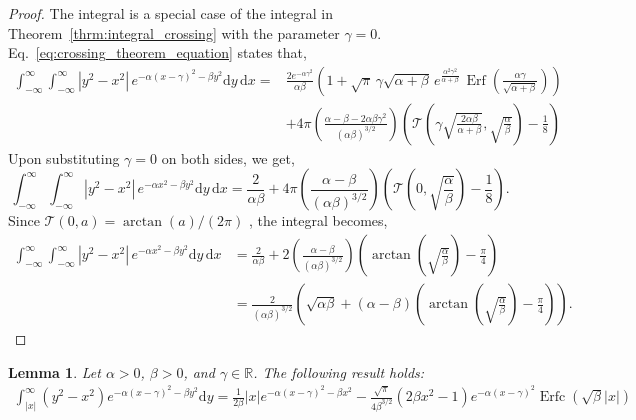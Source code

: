 \documentclass[journal]{IEEEtran}
\theoremstyle{plain}
\newtheorem{lemma}[theorem]{Lemma}
\theoremstyle{definition}
\theoremstyle{remark}
\newcommand{\R}{\mathbb{R}}
\newcommand{\Ot}{\mathcal{T}}
\newcommand{\Erf}{\operatorname{Erf}}
\newcommand{\Erfc}{\operatorname{Erfc}}
\newcommand{\dd}{\mathrm{d}}
\begin{document}
\begin{proof}
The integral is a special case of the integral in Theorem~\ref{thrm:integral_crossing} with the parameter $\gamma=0$. Eq.~\eqref{eq:crossing_theorem_equation} states that,
\begin{equation}
\begin{split}
 \int_{-\infty}^\infty \int_{-\infty}^\infty \left|y^2-x^2\right| \, e^{-\alpha(x-\gamma)^2-\beta y^2} \dd y \, \dd x =& \frac{2e^{-\alpha \gamma^2}}{\alpha\beta} \left(1 + \sqrt{\pi} \, \gamma \sqrt{\alpha + \beta}  \, e^{\frac{\alpha^2 \gamma^2}{\alpha + \beta}}  \, \Erf\left(\frac{\alpha \gamma}{\sqrt{\alpha + \beta}}\right)\right) \\& + 4 \pi \left(\frac{\alpha - \beta - 2\alpha \beta \gamma^2}{\left(\alpha\beta\right)^{3/2}}\right) \left(\Ot\left(\gamma\sqrt{\frac{2\alpha\beta}{\alpha+\beta}}, \sqrt{\frac{\alpha}{\beta}}\right)-\frac{1}{8}\right)
\end{split} 
\end{equation}
Upon substituting $\gamma=0$ on both sides, we get,
\begin{equation}
  \int_{-\infty}^\infty \int_{-\infty}^\infty \left|y^2-x^2\right| \, e^{-\alpha x^2-\beta y^2} \dd y \, \dd x = \frac{2}{\alpha\beta} 
    + 4 \pi \left(\frac{\alpha - \beta}{(\alpha\beta)^{3/2}}\right) \left(\Ot\left(0, \sqrt{\frac{\alpha}{\beta}}\right) - \frac{1}{8}\right).
\end{equation}
Since $\Ot(0,a) = \arctan\left(a\right) / (2\pi)$ \cite{owen1980table}, the integral becomes,
\begin{equation}
\begin{split}
  \int_{-\infty}^\infty \int_{-\infty}^\infty \left|y^2-x^2\right| \, e^{-\alpha x^2-\beta y^2} \dd y \, \dd x &= \frac{2}{\alpha\beta} 
    +  2\left(\frac{\alpha - \beta}{(\alpha\beta)^{3/2}}\right) \left(\arctan\left( \sqrt{\frac{\alpha}{\beta}}\right) -\frac{\pi}{4}\right)\\
    &= \frac{2}{\left(\alpha \beta\right)^{3/2}} \left(\sqrt{\alpha \beta} + \left(\alpha-\beta\right)\left(\arctan\left( \sqrt{\frac{\alpha}{\beta}}\right) -\frac{\pi}{4}\right)\right).
\end{split}
\end{equation}
\end{proof}




\begin{lemma} \label{lemma:inner_integral}
Let $\alpha > 0$, $\beta > 0$, and $\gamma \in \R$. The following result holds:
\begin{equation}
\begin{split}
    \int_{|x|}^{\infty} \left( y^{2} - x^{2} \right) e^{ -\alpha (x - \gamma)^{2} - \beta y^{2} } \dd y = \frac{1}{2 \beta}  |x|e^{ -\alpha (x - \gamma)^{2} -\beta x^{2}}  - \frac{\sqrt{\pi}}{4 \beta^{3/2}} \left(2 \beta x^2 - 1\right) e^{ -\alpha (x - \gamma)^{2} } \Erfc\left(\sqrt{\beta}|x|\right)
\end{split}
\end{equation}
\end{lemma}
\end{document}
